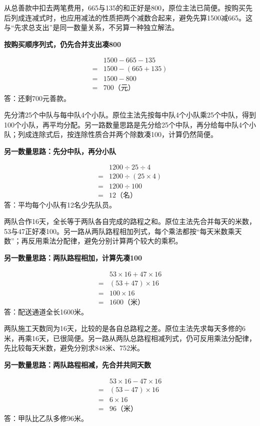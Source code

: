 \documentclass[multi=snippet,border=0pt]{standalone}
\newenvironment{snippet}[3]{\begin{minipage}{#1bp}\color{answerred}\fontsize{#2}{#3}\selectfont\raggedright}{\end{minipage}}
\begin{document}
\begin{snippet}{505}{11.5}{14}从总善款中扣去两笔费用，665与135的和正好是800，原位主法已简便。按购买先后列成连减式时，也应用减法的性质把两个减数合起来，避免先算1500减665。这与“先求总支出”是同一数量关系，不另算一种独立解法。\par \textbf{按购买顺序列式，仍先合并支出凑800}\par \[\begin{aligned}&1500-665-135\\={}&1500-(665+135)\\={}&1500-800\\={}&700\text{（元）}\end{aligned}\]答：还剩700元善款。\end{snippet}
\begin{snippet}{505}{11.5}{14}先分清25个中队与每中队4个小队。原位主法先按每中队4个小队乘25个中队，得到100个小队，再平均分配。另一路数量思路是先分给25个中队，再分给每中队4个小队；列成连除式后，按连除性质合并两个除数凑100，计算仍然简便。\par \textbf{另一数量思路：先分中队，再分小队}\par \[\begin{aligned}&1200\div25\div4\\={}&1200\div(25\times4)\\={}&1200\div100\\={}&12\text{（名）}\end{aligned}\]答：平均每个小队有12名少先队员。\end{snippet}
\begin{snippet}{505}{11.5}{14}两队合作16天，全长等于两队各自完成的路程之和。原位主法先合并每天的米数，53与47正好凑100。另一路从两队路程相加列式，每个乘法都按“每天米数乘天数”；再反用乘法分配律，避免分别计算两个较大的乘积。\par \textbf{另一数量思路：两队路程相加，计算先凑100}\par \[\begin{aligned}&53\times16+47\times16\\={}&(53+47)\times16\\={}&100\times16\\={}&1600\text{（米）}\end{aligned}\]答：配送通道全长1600米。\end{snippet}
\begin{snippet}{505}{11.5}{14}两队施工天数同为16天，比较的是各自总路程之差。原位主法先求每天多修的6米，再乘16天，已很简便。另一路从两队总路程相减列式，仍可反用乘法分配律，先比较每天米数，避免分别求848米、752米。\par \textbf{另一数量思路：两队路程相减，先合并共同天数}\par \[\begin{aligned}&53\times16-47\times16\\={}&(53-47)\times16\\={}&6\times16\\={}&96\text{（米）}\end{aligned}\]答：甲队比乙队多修96米。\end{snippet}
\end{document}
